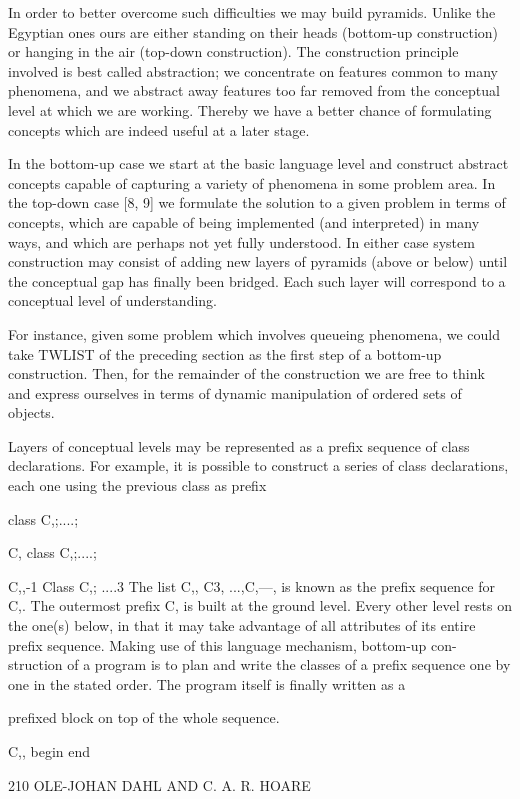 {{{{{		In order to better overcome such difficulties we may build pyramids. Unlike the Egyptian ones ours are either standing on their heads (bottom-up construction) or hanging in the air (top-down construction). The construction principle involved is best called abstraction; we concentrate on features common to many phenomena, and we abstract away features too far removed from the conceptual level at which we are working. Thereby we have a better chance of formulating concepts which are indeed useful at a later stage.
		
		In the bottom-up case we start at the basic language level and construct abstract concepts capable of capturing a variety of phenomena in some problem area. In the top-down case [8, 9] we formulate the solution to a given problem in terms of concepts, which are capable of being implemented (and interpreted) in many ways, and which are perhaps not yet fully understood. In either case system construction may consist of adding new layers of pyramids (above or below) until the conceptual gap has finally been bridged. Each such layer will correspond to a conceptual level of understanding.
		
		For instance, given some problem which involves queueing phenomena, we could take TWLIST of the preceding section as the first step of a bottom-up construction. Then, for the remainder of the construction we are free to think and express ourselves in terms of dynamic manipulation of ordered sets of objects.
		
		Layers of conceptual levels may be represented as a prefix sequence of class declarations. For example, it is possible to construct a series of class declarations, each one using the previous class as prefix
		
		class C,;....;
		
		C, class C,;....;
		
		C,,-1 Class C,; ....3 The list C,, C3, ...,C,—, is known as the prefix sequence for C,. The outermost prefix C, is built at the ground level. Every other level rests on the one(s) below, in that it may take advantage of all attributes of its entire prefix sequence. Making use of this language mechanism, bottom-up con- struction of a program is to plan and write the classes of a prefix sequence one by one in the stated order. The program itself is finally written as a
		
		prefixed block on top of the whole sequence.
		
		C,, begin end
		
		
		210 OLE-JOHAN DAHL AND C. A. R. HOARE
		
}}}}}
